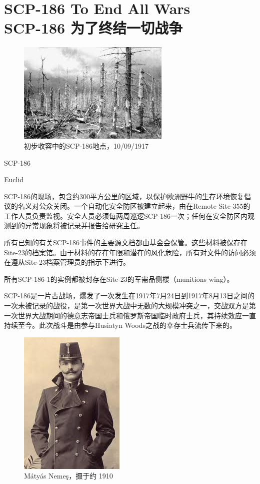 \chapter[SCP-186 为了终结一切战争]{
    SCP-186 To End All Wars\\
    SCP-186 为了终结一切战争
}

\label{chap:SCP-186}

\begin{figure}[H]
    \centering
    \includegraphics[width=0.5\linewidth]{images/SCP-186.jpg}
    \caption*{初步收容中的SCP-186地点，10\slash 09\slash 1917}
\end{figure}

SCP-186

Euclid

SCP-186的现场，包含约300平方公里的区域，以保护欧洲野牛的生存环境恢复倡议的名义对公众关闭。一个自动化安全防区被建立起来，由在Remote Site-355的工作人员负责监视。安全人员必须每两周巡逻SCP-186一次；任何在安全防区内观测到的异常现象将被记录并报告给研究主任。

所有已知的有关SCP-186事件的主要源文档都由基金会保管。这些材料被保存在Site-23的档案馆。由于材料的存在年限和潜在的风化危险，所有对文件的访问必须在遵从Site-23档案管理员的指示下进行。

所有SCP-186-1的实例都被封存在Site-23的军需品侧楼（munitions wing）。

SCP-186是一片古战场，爆发了一次发生在1917年7月24日到1917年8月13日之间的一次未被记录的战役，是第一次世界大战中无数的大规模冲突之一，交战双方是第一次世界大战期间的德意志帝国士兵和俄罗斯帝国临时政府士兵，其持续效应一直持续至今。此次战斗是由参与Husiatyn Woods之战的幸存士兵流传下来的。

\begin{figure}[H]
    \centering
    \includegraphics[width=0.5\linewidth]{images/SCP-186-2.jpg}
    \caption*{Mátyás Nemeş，摄于约 1910}
\end{figure}

